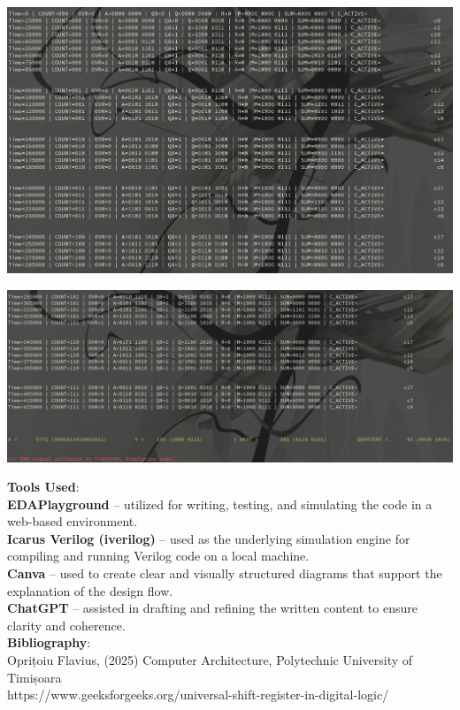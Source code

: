 \documentclass[12pt, letterpaper]{article}
\begin{document}
\begin{center}
\includegraphics[scale=0.3]{Documentation/DIV1}
\end{center}

\begin{center}
\includegraphics[scale=0.3]{Documentation/DIV2}
\end{center}

\newpage


\textbf{Tools Used}:\\

\textbf{EDAPlayground} – utilized for writing, testing, and simulating the code in a web-based environment.\\

\textbf{Icarus Verilog (iverilog)} – used as the underlying simulation engine for compiling and running Verilog code on a local machine.\\

\textbf{Canva} – used to create clear and visually structured diagrams that support the explanation of the design flow.\\

\textbf{ChatGPT} – assisted in drafting and refining the written content to ensure clarity and coherence.\\

\textbf{Bibliography}:\\

Oprițoiu Flavius, (2025) Computer Architecture, Polytechnic University of Timișoara\\
https://www.geeksforgeeks.org/universal-shift-register-in-digital-logic/
\end{document}
